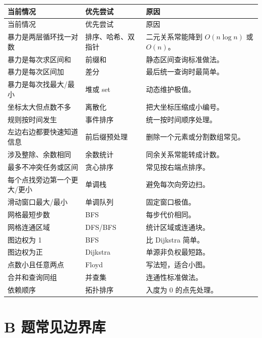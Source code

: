 \begin{longtable}{p{4cm}p{5cm}p{5cm}}
\toprule
当前情况 & 优先尝试 & 原因 \\
\midrule
\endfirsthead
\toprule
当前情况 & 优先尝试 & 原因 \\
\midrule
\endhead
暴力是两层循环找一对数 & 排序、哈希、双指针 & 二元关系常能降到 $O(n\log n)$ 或 $O(n)$。 \\
暴力是每次求区间和 & 前缀和 & 静态区间查询标准做法。 \\
暴力是每次区间加 & 差分 & 最后统一查询时最简单。 \\
暴力是每次找最大/最小 & 堆或 set & 动态维护极值。 \\
坐标太大但点数不多 & 离散化 & 把大坐标压缩成小编号。 \\
规则按时间发生 & 事件排序 & 统一按时间顺序处理。 \\
左边右边都要快速知道信息 & 前后缀预处理 & 删除一个元素或分割数组常见。 \\
涉及整除、余数相同 & 余数统计 & 同余关系常能转成计数。 \\
最多不冲突任务或区间 & 贪心排序 & 常见按右端点排序。 \\
每个点找旁边第一个更大/更小 & 单调栈 & 避免每次向旁边扫。 \\
滑动窗口最大/最小 & 单调队列 & 固定窗口极值。 \\
网格最短步数 & BFS & 每步代价相同。 \\
网格连通区域 & DFS/BFS & 统计区域或连通块。 \\
图边权为 1 & BFS & 比 Dijkstra 简单。 \\
图边权为正 & Dijkstra & 单源非负权最短路。 \\
点数小且任意两点 & Floyd & 写法短，适合小图。 \\
合并和查询同组 & 并查集 & 连通性标准做法。 \\
依赖顺序 & 拓扑排序 & 入度为 0 的点先处理。 \\
\bottomrule
\end{longtable}

\section{B 题常见边界库}\label{sec:06-29}

